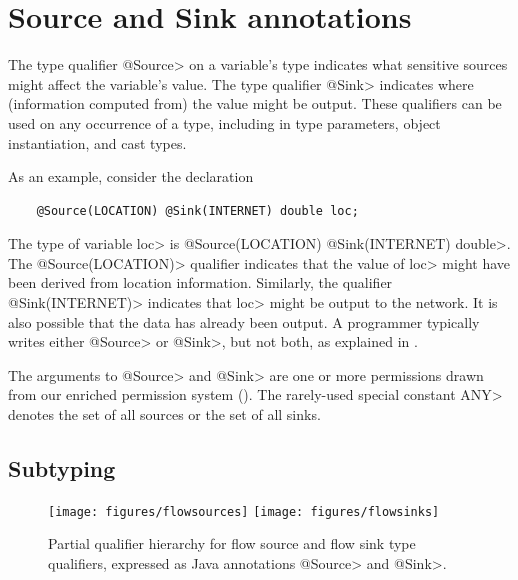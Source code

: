 



\section{Source and Sink annotations\label{sec:flow-type-system}}


The type qualifier \<@Source> on a variable's
type indicates what sensitive sources might affect the variable's value.
The type qualifier \<@Sink> indicates where (information computed from) the
value might be output.
These qualifiers can be used on any occurrence
of a type, including in type parameters, object instantiation, and cast types.


As an example, consider the declaration

\begin{Verbatim}
    @Source(LOCATION) @Sink(INTERNET) double loc;
\end{Verbatim}

\noindent
The type of variable \<loc> is \<@Source(LOCATION) @Sink(INTERNET)
double>.
The \<@Source(LOCATION)> qualifier indicates that the
value of \<loc> might have been derived from
location information.
Similarly, the qualifier \<@Sink(INTERNET)> indicates that
\<loc> might be output to the network.  It is also
possible that the data has already been output.
A programmer typically writes either \<@Source> or \<@Sink>, but not both, as explained
in  . 

The arguments to \<@Source> and \<@Sink> are one or more permissions
drawn from our enriched permission system ().
The rarely-used special constant \<ANY> denotes the set of all sources or the set of all
sinks.

\subsection{Subtyping\label{sec:subtyping}}

\begin{figure}
\centerline{\texttt{[image: figures/flowsources]}%
  \hfill%
  \texttt{[image: figures/flowsinks]}}
\caption{Partial qualifier hierarchy for flow source and flow sink type
  qualifiers, expressed as Java annotations \<@Source> and \<@Sink>.}
\label{fig:flow-hierarchy}
\end{figure}


